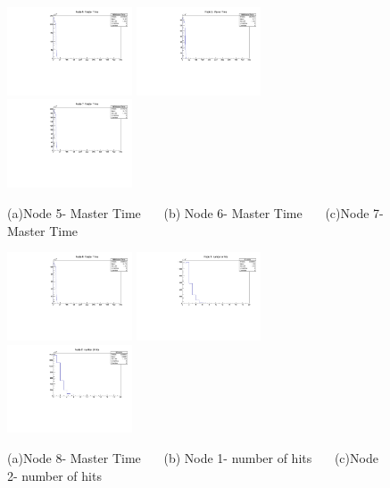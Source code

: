 \documentclass[a4paper,11pt]{article}
\theoremstyle{mytheor}
\begin{document}
\begin{figure}[H] 
\vspace*{-0.3cm} 
\includegraphics[width=0.33\textwidth,scale=0.5,trim=0 0 0 0,clip]{plotsdir/file0_test-N5MasterTime-1.pdf} 
\includegraphics[width=0.33\textwidth,scale=0.5,trim=0 0 0 0,clip]{plotsdir/file0_test-N6MasterTime-1.pdf} 
\includegraphics[width=0.33\textwidth,scale=0.5,trim=0 0 0 0,clip]{plotsdir/file0_test-N7MasterTime-1.pdf} 
\caption{(a)Node 5- Master Time ~~~(b) Node 6- Master Time ~~~(c)Node 7- Master Time } 
\end{figure} 
\begin{figure}[H] 
\vspace*{-0.3cm} 
\includegraphics[width=0.33\textwidth,scale=0.5,trim=0 0 0 0,clip]{plotsdir/file0_test-N8MasterTime-1.pdf} 
\includegraphics[width=0.33\textwidth,scale=0.5,trim=0 0 0 0,clip]{plotsdir/file0_test-N1nhits-1.pdf} 
\includegraphics[width=0.33\textwidth,scale=0.5,trim=0 0 0 0,clip]{plotsdir/file0_test-N2nhits-1.pdf} 
\caption{(a)Node 8- Master Time ~~~(b) Node 1- number of hits ~~~(c)Node 2- number of hits } 
\end{figure} 
\end{document}
